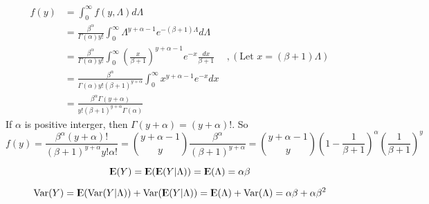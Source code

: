 \documentclass[12pt]{article}
\begin{document}
$$
\begin{aligned}
f(y) &= \int_0^{\infty} f(y, \Lambda) d\Lambda \\ 
&=  \frac{\beta^{\alpha}}{\Gamma(\alpha)y!} \int_0^{\infty} \Lambda^{y + \alpha -1 } e^{-(\beta +1) \Lambda}  d\Lambda \\
&=  \frac{\beta^{\alpha}}{\Gamma(\alpha)y!} \int_0^{\infty}\left( \frac{x}{\beta+1} \right)^{y + \alpha -1 } e^{-x}  \frac{dx}{\beta+1}  & ,(\mbox{Let } x=(\beta+1)\Lambda) \\
&=  \frac{\beta^{\alpha}}{\Gamma(\alpha)y!(\beta+1)^{y + \alpha}} \int_0^{\infty}x^{y + \alpha -1 } e^{-x} dx \\
&=  \frac{\beta^{\alpha}\Gamma(y + \alpha)}{y!(\beta+1)^{y + \alpha}\Gamma(\alpha)}
\end{aligned} 
$$
If $\alpha$ is positive interger, then $\Gamma(y+\alpha) = (y+\alpha)!$. So $$f(y) =  \frac{\beta^{\alpha}(y + \alpha)!}{(\beta+1)^{y + \alpha}y! \alpha !} = {y+\alpha - 1 \choose y} \frac{\beta^{\alpha}}{(\beta+1)^{y + \alpha}} = {y+\alpha - 1 \choose y} \left( 1 - \frac{1}{\beta+1}\right)^{\alpha} \left(\frac{1}{\beta+1} \right)^y$$

$${\rm I\kern-.3em E}(Y) = {\rm I\kern-.3em E}({\rm I\kern-.3em E}(Y|\Lambda)) = {\rm I\kern-.3em E}(\Lambda) = \alpha \beta $$

$$ \mathrm{Var} (Y) = {\rm I\kern-.3em E} (\mathrm{Var}(Y | \Lambda)) + \mathrm{Var} ({\rm I\kern-.3em E} (Y | \Lambda)) ={\rm I\kern-.3em E} (\Lambda) + \mathrm{Var} (\Lambda) = \alpha \beta + \alpha \beta^2$$
\end{document}
